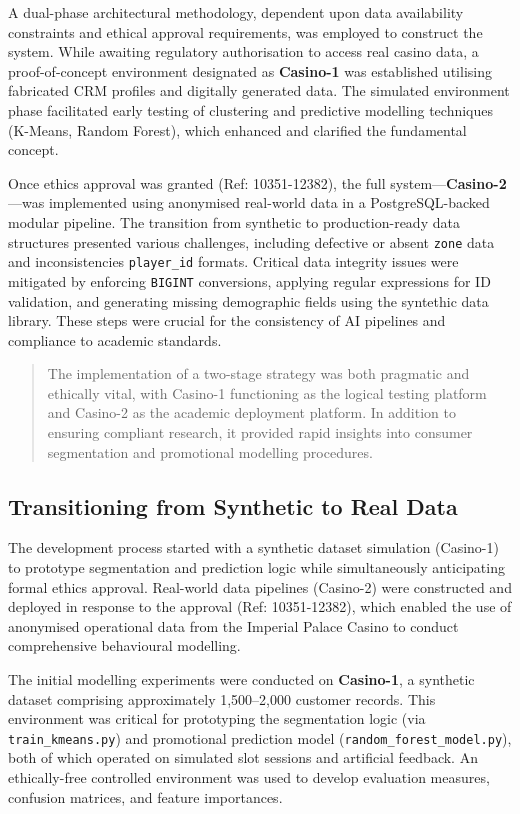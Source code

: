 \documentclass[12pt,a4paper]{report}
\begin{document}
A dual-phase architectural methodology, dependent upon data availability constraints and ethical approval requirements, was employed to construct the system.  While awaiting regulatory authorisation to access real casino data, a proof-of-concept environment designated as \textbf{Casino-1} was established utilising fabricated CRM profiles and digitally generated data.   The simulated environment phase facilitated early testing of clustering and predictive modelling techniques (K-Means, Random Forest), which enhanced and clarified the fundamental concept.

Once ethics approval was granted (Ref: 10351-12382), the full system—\textbf{Casino-2}—was implemented using anonymised real-world data in a PostgreSQL-backed modular pipeline. The transition from synthetic to production-ready data structures presented various challenges, including defective or absent \texttt{zone} data and inconsistencies \texttt{player\_id} formats. Critical data integrity issues were mitigated by enforcing \texttt{BIGINT} conversions, applying regular expressions for ID validation, and generating missing demographic fields using the syntethic data library. These steps were crucial for the consistency of AI pipelines and compliance to academic standards.

\begin{quote}
The implementation of a two-stage strategy was both pragmatic and ethically vital, with Casino-1 functioning as the logical testing platform and Casino-2 as the academic deployment platform.   In addition to ensuring compliant research, it provided rapid insights into consumer segmentation and promotional modelling procedures.
\end{quote}

\subsection{Transitioning from Synthetic to Real Data}

The development process started with a synthetic dataset simulation (Casino-1) to prototype segmentation and prediction logic while simultaneously anticipating formal ethics approval.  Real-world data pipelines (Casino-2) were constructed and deployed in response to the approval (Ref: 10351-12382), which enabled the use of anonymised operational data from the Imperial Palace Casino to conduct comprehensive behavioural modelling.

The initial modelling experiments were conducted on \textbf{Casino-1}, a synthetic dataset comprising approximately 1,500–2,000 customer records. This environment was critical for prototyping the segmentation logic (via \texttt{train\_kmeans.py}) and promotional prediction model (\texttt{random\_forest\_model.py}), both of which operated on simulated slot sessions and artificial feedback. An ethically-free controlled environment was used to develop evaluation measures, confusion matrices, and feature importances.
\end{document}
